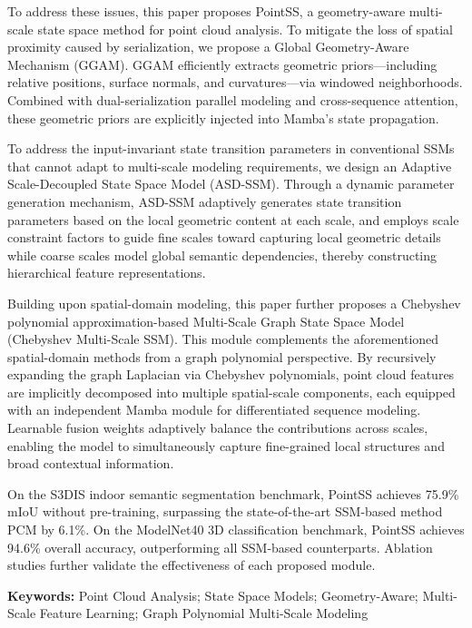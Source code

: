 \documentclass[12pt,a4paper,openany,oneside]{ctexbook}
\theoremstyle{definition}
\theoremstyle{remark}
\begin{document}
To address these issues, this paper proposes PointSS, a geometry-aware multi-scale state space method for point cloud analysis. To mitigate the loss of spatial proximity caused by serialization, we propose a Global Geometry-Aware Mechanism (GGAM). GGAM efficiently extracts geometric priors—including relative positions, surface normals, and curvatures—via windowed neighborhoods. Combined with dual-serialization parallel modeling and cross-sequence attention, these geometric priors are explicitly injected into Mamba's state propagation.

To address the input-invariant state transition parameters in conventional SSMs that cannot adapt to multi-scale modeling requirements, we design an Adaptive Scale-Decoupled State Space Model (ASD-SSM). Through a dynamic parameter generation mechanism, ASD-SSM adaptively generates state transition parameters based on the local geometric content at each scale, and employs scale constraint factors to guide fine scales toward capturing local geometric details while coarse scales model global semantic dependencies, thereby constructing hierarchical feature representations.

Building upon spatial-domain modeling, this paper further proposes a Chebyshev polynomial approximation-based Multi-Scale Graph State Space Model (Chebyshev Multi-Scale SSM). This module complements the aforementioned spatial-domain methods from a graph polynomial perspective. By recursively expanding the graph Laplacian via Chebyshev polynomials, point cloud features are implicitly decomposed into multiple spatial-scale components, each equipped with an independent Mamba module for differentiated sequence modeling. Learnable fusion weights adaptively balance the contributions across scales, enabling the model to simultaneously capture fine-grained local structures and broad contextual information.

On the S3DIS indoor semantic segmentation benchmark, PointSS achieves 75.9\% mIoU without pre-training, surpassing the state-of-the-art SSM-based method PCM by 6.1\%. On the ModelNet40 3D classification benchmark, PointSS achieves 94.6\% overall accuracy, outperforming all SSM-based counterparts. Ablation studies further validate the effectiveness of each proposed module.

\vspace{1em}
\noindent\textbf{Keywords:} Point Cloud Analysis; State Space Models; Geometry-Aware; Multi-Scale Feature Learning; Graph Polynomial Multi-Scale Modeling
\end{document}
